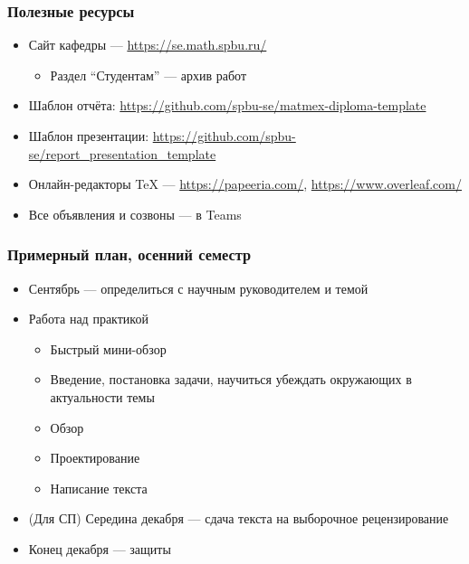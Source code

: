 \documentclass{../../slides-style}
\begin{document}
    \begin{frame}
        \frametitle{Полезные ресурсы}
        \begin{itemize}
            \item Сайт кафедры --- \url{https://se.math.spbu.ru/}
            \begin{itemize}
                \item Раздел ``Студентам'' --- архив работ
            \end{itemize}
            \item Шаблон отчёта: \url{https://github.com/spbu-se/matmex-diploma-template}
            \item Шаблон презентации: \url{https://github.com/spbu-se/report_presentation_template}
            \item Онлайн-редакторы TeX --- \url{https://papeeria.com/}, \url{https://www.overleaf.com/}
            \item Все объявления и созвоны --- в Teams
        \end{itemize}
    \end{frame}

    \begin{frame}
        \frametitle{Примерный план, осенний семестр}
        \begin{itemize}
            \item Сентябрь --- определиться с научным руководителем и темой
            \item Работа над практикой
            \begin{itemize}
                \item Быстрый мини-обзор
                \item Введение, постановка задачи, научиться убеждать окружающих в актуальности темы
                \item Обзор
                \item Проектирование
                \item Написание текста
            \end{itemize}
            \item (Для СП) Середина декабря --- сдача текста на выборочное рецензирование
            \item Конец декабря --- защиты
        \end{itemize}
    \end{frame}
\end{document}
